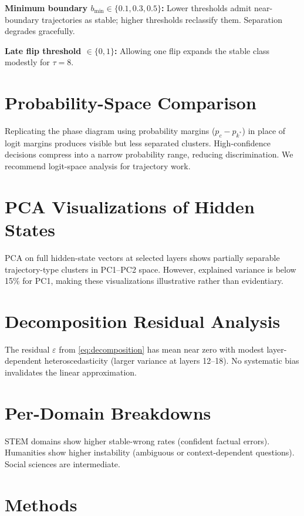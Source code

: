 \documentclass{article}
\begin{document}
\textbf{Minimum boundary $b_{\min} \in \{0.1, 0.3, 0.5\}$:}  Lower thresholds admit near-boundary trajectories as stable; higher thresholds reclassify them.  Separation degrades gracefully.

\textbf{Late flip threshold $\in \{0, 1\}$:}  Allowing one flip expands the stable class modestly for $\tau = 8$.

\section{Probability-Space Comparison}
\label{sec:appendix_prob}

Replicating the phase diagram using probability margins ($p_c - p_{k^*}$) in place of logit margins produces visible but less separated clusters.  High-confidence decisions compress into a narrow probability range, reducing discrimination.  We recommend logit-space analysis for trajectory work.

\section{PCA Visualizations of Hidden States}
\label{sec:appendix_pca}

PCA on full hidden-state vectors at selected layers shows partially separable trajectory-type clusters in PC1--PC2 space.  However, explained variance is below 15\% for PC1, making these visualizations illustrative rather than evidentiary.

\section{Decomposition Residual Analysis}

The residual $\varepsilon$ from \cref{eq:decomposition} has mean near zero with modest layer-dependent heteroscedasticity (larger variance at layers 12--18).  No systematic bias invalidates the linear approximation.

\section{Per-Domain Breakdowns}

STEM domains show higher stable-wrong rates (confident factual errors).  Humanities show higher instability (ambiguous or context-dependent questions).  Social sciences are intermediate.

\section{Methods}
\label{sec:methods}
\end{document}
